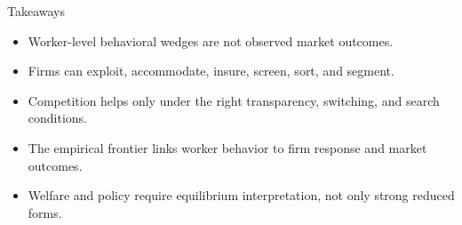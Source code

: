 \documentclass[aspectratio=169,11pt]{beamer}
\begin{document}
\begin{frame}{Takeaways}
\begin{itemize}
    \item Worker-level behavioral wedges are not observed market outcomes.
    \item Firms can exploit, accommodate, insure, screen, sort, and segment.
    \item Competition helps only under the right transparency, switching, and search conditions.
    \item The empirical frontier links worker behavior to firm response and market outcomes.
    \item Welfare and policy require equilibrium interpretation, not only strong reduced forms.
\end{itemize}
\end{frame}
\end{document}
